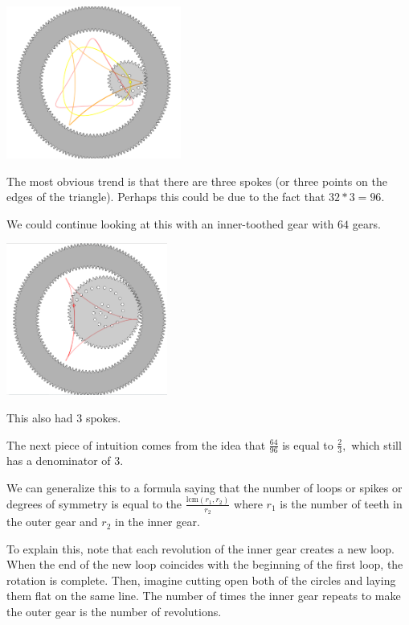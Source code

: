 \documentclass{article}
\begin{document}
\begin{center}
\includegraphics[height=5cm]{images/Spokes.png}
\end{center}

The most obvious trend is that there are three spokes (or three points on the edges of the triangle). Perhaps this could be due to the fact that $32 * 3 = 96.$

We could continue looking at this with an inner-toothed gear with $64$ gears. 

\begin{center}
\includegraphics[height=5cm]{images/Gear72.png}
\end{center}

This also had $3$ spokes. 

The next piece of intuition comes from the idea that $\frac{64}{96}$ is equal to $\frac{2}{3},$ which still has a denominator of $3.$

We can generalize this to a formula saying that the number of loops or spikes or degrees of symmetry is equal to the $\frac{\text{lcm}(r_1, r_2)}{r_2}$ where $r_1$ is the number of teeth in the outer gear and $r_2$ in the inner gear.

To explain this, note that each revolution of the inner gear creates a new loop. When the end of the new loop coincides with the beginning of the first loop, the rotation is complete. Then, imagine cutting open both of the circles and laying them flat on the same line. The number of times the inner gear repeats to make the outer gear is the number of revolutions. 
\end{document}
